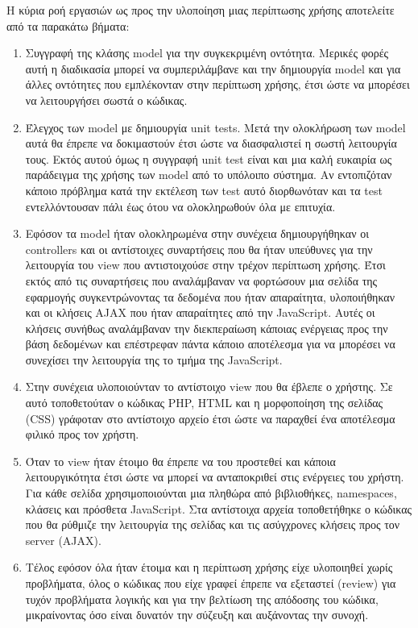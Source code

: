 Η κύρια ροή εργασιών ως προς την υλοποίηση μιας περίπτωσης χρήσης αποτελείτε από τα παρακάτω βήματα:
\begin{enumerate}
\item Συγγραφή της κλάσης model για την συγκεκριμένη οντότητα. Μερικές φορές αυτή η διαδικασία μπορεί να συμπεριλάμβανε και την δημιουργία model και για άλλες οντότητες που εμπλέκονταν στην περίπτωση χρήσης, έτσι ώστε να μπορέσει να λειτουργήσει σωστά ο κώδικας.
\item Έλεγχος των model με δημιουργία unit tests. Μετά την ολοκλήρωση των model αυτά θα έπρεπε να δοκιμαστούν έτσι ώστε να διασφαλιστεί η σωστή λειτουργία τους. Εκτός αυτού όμως η συγγραφή unit test είναι και μια καλή ευκαιρία ως παράδειγμα της χρήσης των model από το υπόλοιπο σύστημα. Αν εντοπιζόταν κάποιο πρόβλημα κατά την εκτέλεση των test αυτό διορθωνόταν και τα test εντελλόντουσαν πάλι έως ότου να ολοκληρωθούν όλα με επιτυχία.
\item Εφόσον τα model ήταν ολοκληρωμένα στην συνέχεια δημιουργήθηκαν οι controllers και οι αντίστοιχες συναρτήσεις που θα ήταν υπεύθυνες για την λειτουργία του view που αντιστοιχούσε στην τρέχον περίπτωση χρήσης. Έτσι εκτός από τις συναρτήσεις που αναλάμβαναν να φορτώσουν μια σελίδα της εφαρμογής συγκεντρώνοντας τα δεδομένα που ήταν απαραίτητα, υλοποιήθηκαν και οι κλήσεις AJAX που ήταν απαραίτητες από την JavaScript. Αυτές οι κλήσεις συνήθως αναλάμβαναν την διεκπεραίωση κάποιας ενέργειας προς την βάση δεδομένων και επέστρεφαν πάντα κάποιο αποτέλεσμα για να μπορέσει να συνεχίσει την λειτουργία της το τμήμα της JavaScript.
\item Στην συνέχεια υλοποιούνταν το αντίστοιχο view που θα έβλεπε ο χρήστης. Σε αυτό τοποθετούταν ο κώδικας PHP, HTML και η μορφοποίηση της σελίδας (CSS) γράφοταν στο αντίστοιχο αρχείο έτσι ώστε να παραχθεί ένα αποτέλεσμα φιλικό προς τον χρήστη.
\item Όταν το view ήταν έτοιμο θα έπρεπε να του προστεθεί και κάποια λειτουργικότητα έτσι ώστε να μπορεί να ανταποκριθεί στις ενέργειες του χρήστη. Για κάθε σελίδα χρησιμοποιούνται μια πληθώρα από βιβλιοθήκες, namespaces, κλάσεις και πρόσθετα JavaScript. Στα αντίστοιχα αρχεία τοποθετήθηκε ο κώδικας που θα ρύθμιζε την λειτουργία της σελίδας και τις ασύγχρονες κλήσεις προς τον server (AJAX). 
\item Τέλος εφόσον όλα ήταν έτοιμα και η περίπτωση χρήσης είχε υλοποιηθεί χωρίς προβλήματα, όλος ο κώδικας που είχε γραφεί έπρεπε να εξεταστεί (review) για τυχόν προβλήματα λογικής και για την βελτίωση της απόδοσης του κώδικα, μικραίνοντας όσο είναι δυνατόν την σύζευξη και αυξάνοντας την συνοχή.
\end{enumerate}

